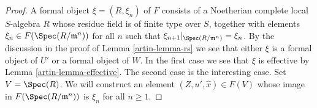 \begin{proof}

A formal object $\xi = (R, \xi_n)$ of $F$ consists of a Noetherian
complete local $S$-algebra $R$ whose residue field is of finite type
over $S$, together with elements $\xi_n \in F(\Spec(R/\mathfrak m^n))$
for all $n$ such that $\xi_{n + 1}|_{\Spec(R/\mathfrak m^n)} = \xi_n$.
By the discussion in the proof of Lemma \ref{artin-lemma-rs}
we see that either $\xi$ is a formal object of $U'$ or a formal
object of $W$. In the first case we see that $\xi$ is effective
by Lemma \ref{artin-lemma-effective}. The second case is the interesting case.
Set $V = \Spec(R)$. We will construct an element
$(Z, u', \hat x) \in F(V)$ whose image in $F(\Spec(R/\mathfrak m^n))$
is $\xi_n$ for all $n \geq 1$.


\end{proof}
